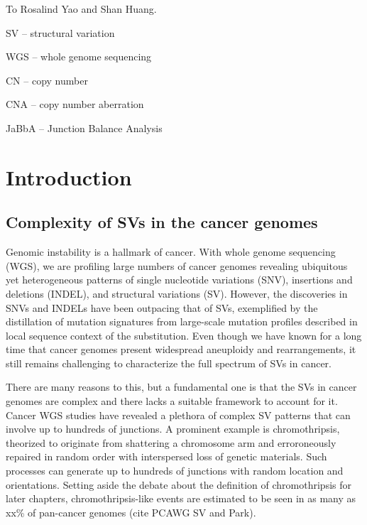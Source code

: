 \documentclass[phd,tocprelim]{cornell}
\begin{document}
\begin{dedication}
To Rosalind Yao and Shan Huang.
\end{dedication}

\begin{acknowledgements}

\end{acknowledgements}



\contentspage
\tablelistpage
\figurelistpage
\abbrlist

SV -- structural variation

WGS -- whole genome sequencing

CN -- copy number

CNA -- copy number aberration

JaBbA -- Junction Balance Analysis

\symlist

\normalspacing \setcounter{page}{1} 
\pagestyle{cornell} \addtolength{\parskip}{0.5\baselineskip}

\chapter{Introduction}

\section{Complexity of SVs in the cancer genomes}
Genomic instability is a hallmark of cancer. With whole genome sequencing (WGS), we are profiling large numbers of cancer genomes revealing ubiquitous yet heterogeneous patterns of single nucleotide variations (SNV), insertions and deletions (INDEL), and structural variations (SV). However, the discoveries in SNVs and INDELs have been outpacing that of SVs, exemplified by the distillation of mutation signatures from large-scale mutation profiles described in local sequence context of the substitution. Even though we have known for a long time that cancer genomes present widespread aneuploidy and rearrangements, it still remains challenging to characterize the full spectrum of SVs in cancer.

There are many reasons to this, but a fundamental one is that the SVs in cancer genomes are complex and there lacks a suitable framework to account for it. Cancer WGS studies have revealed a plethora of complex SV patterns that can involve up to hundreds of junctions. A prominent example is chromothripsis, theorized to originate from  shattering a chromosome arm and erroroneously repaired in random order with interspersed loss of genetic materials. Such processes can generate up to hundreds of junctions with random location and orientations. Setting aside the debate about the definition of chromothripsis for later chapters, chromothripsis-like events are estimated to be seen in as many as xx\% of pan-cancer genomes (cite PCAWG SV and Park).
\end{document}
